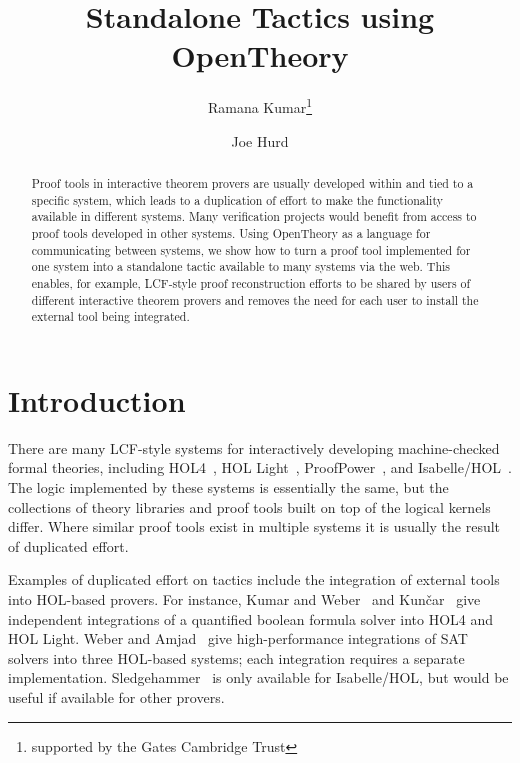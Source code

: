 \documentclass{llncs}
\newcommand{\OpenTheory}{OpenTheory\xspace}
\begin{document}
\title{Standalone Tactics using OpenTheory}

\author{Ramana Kumar\thanks{supported by the Gates Cambridge Trust}\and Joe Hurd}


\maketitle

\begin{abstract}
Proof tools in interactive theorem provers are usually developed within and tied to a specific system, which leads to a duplication of effort to make the functionality available in different systems.
Many verification projects would benefit from access to proof tools developed in other systems.
Using \OpenTheory as a language for communicating between systems, we show how to turn a proof tool implemented for one system into a standalone tactic available to many systems via the web.
This enables, for example, LCF-style proof reconstruction efforts to be shared by users of different interactive theorem provers and removes the need for each user to install the external tool being integrated.
\end{abstract}

\section{Introduction}

There are many LCF-style systems for interactively developing machine-checked formal theories, including HOL4~\cite{slind08brief}, HOL Light~\cite{DBLP:conf/tphol/Harrison09a}, ProofPower~\cite{ProofPower}, and Isabelle/HOL~\cite{wenzel08isabelle}.
The logic implemented by these systems is essentially the same, but the collections of theory libraries and proof tools built on top of the logical kernels differ.
Where similar proof tools exist in multiple systems it is usually the result of duplicated effort.

Examples of duplicated effort on tactics include the integration of external tools into HOL-based provers.
For instance, Kumar and Weber~\cite{DBLP:conf/itp/KumarW11} and Kun\v{c}ar~\cite{DBLP:conf/itp/Kuncar11} give independent integrations of a quantified boolean formula solver into HOL4 and HOL Light.
Weber and Amjad~\cite{weber09efficiently} give high-performance integrations of SAT solvers into three HOL-based systems; each integration requires a separate implementation.
Sledgehammer~\cite{DBLP:conf/frocos/BlanchetteBN11} is only available for Isabelle/HOL, but would be useful if available for other provers.
\end{document}
